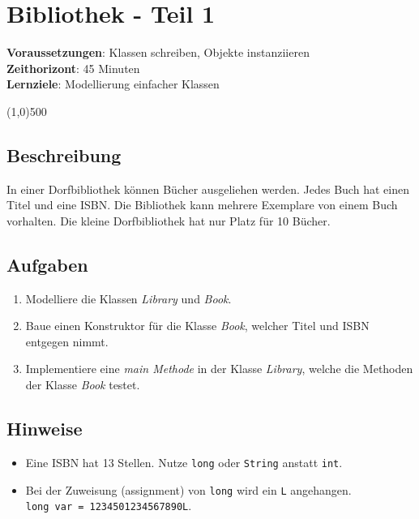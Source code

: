 

\chapter*{Bibliothek - Teil 1}

\headingfont
\parbox {\textwidth}{
    \textbf{Voraussetzungen}: Klassen schreiben, Objekte instanziieren \\
    \textbf{Zeithorizont}: 45 Minuten \\
    \textbf{Lernziele}: Modellierung einfacher Klassen
}

\normalfont
\begin{center}
\line(1,0){500}
\end{center}
\vspace{1cm}

\section*{Beschreibung}
In einer Dorfbibliothek können Bücher ausgeliehen werden. Jedes Buch hat einen Titel und eine ISBN. Die Bibliothek kann mehrere Exemplare von einem Buch vorhalten. Die kleine Dorfbibliothek hat nur Platz für 10 Bücher.

\section*{Aufgaben}
\begin{enumerate}
     \item Modelliere die Klassen \textit{Library} und \textit{Book}.
     \item Baue einen Konstruktor für die Klasse \textit{Book}, welcher Titel und ISBN entgegen nimmt.
     \item Implementiere eine \textit{main Methode} in der Klasse \textit{Library}, welche die Methoden der Klasse \textit{Book} testet.
\end{enumerate}

\section*{Hinweise}
\begin{itemize}
    \item Eine ISBN hat 13 Stellen. Nutze \texttt{long} oder \texttt{String} anstatt \texttt{int}.
    \item Bei der Zuweisung (assignment) von \texttt{long} wird ein \texttt{L} angehangen. \\ \texttt{long var = 1234501234567890L}.
\end{itemize}


